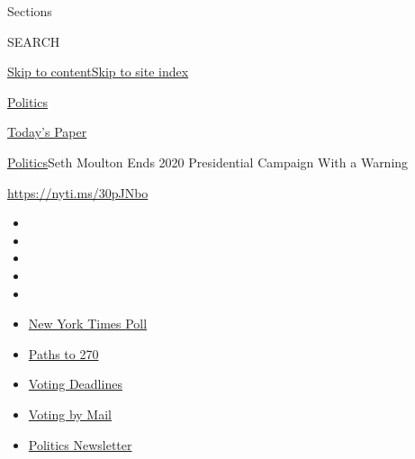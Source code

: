 Sections

SEARCH

\protect\hyperlink{site-content}{Skip to
content}\protect\hyperlink{site-index}{Skip to site index}

\href{https://www.nytimes3xbfgragh.onion/section/politics}{Politics}

\href{https://myaccount.nytimes3xbfgragh.onion/auth/login?response_type=cookie\&client_id=vi}{}

\href{https://www.nytimes3xbfgragh.onion/section/todayspaper}{Today's
Paper}

\href{/section/politics}{Politics}\textbar{}Seth Moulton Ends 2020
Presidential Campaign With a Warning

\url{https://nyti.ms/30pJNbo}

\begin{itemize}
\item
\item
\item
\item
\item
\end{itemize}

\begin{itemize}
\item
  \href{https://www.nytimes3xbfgragh.onion/2020/09/12/us/politics/biden-trump-poll-wisconsin-minnesota.html?action=click\&pgtype=Article\&state=default\&region=TOP_BANNER\&context=storylines_menu}{New
  York Times Poll}
\item
  \href{https://www.nytimes3xbfgragh.onion/interactive/2020/us/elections/election-states-biden-trump.html?action=click\&pgtype=Article\&state=default\&region=TOP_BANNER\&context=storylines_menu}{Paths
  to 270}
\item
  \href{https://www.nytimes3xbfgragh.onion/interactive/2019/us/elections/2020-presidential-election-calendar.html?action=click\&pgtype=Article\&state=default\&region=TOP_BANNER\&context=storylines_menu}{Voting
  Deadlines}
\item
  \href{https://www.nytimes3xbfgragh.onion/interactive/2020/08/31/us/politics/vote-by-mail-deadlines.html?action=click\&pgtype=Article\&state=default\&region=TOP_BANNER\&context=storylines_menu}{Voting
  by Mail}
\item
  \href{https://www.nytimes3xbfgragh.onion/newsletters/politics?action=click\&pgtype=Article\&state=default\&region=TOP_BANNER\&context=storylines_menu}{Politics
  Newsletter}
\end{itemize}

